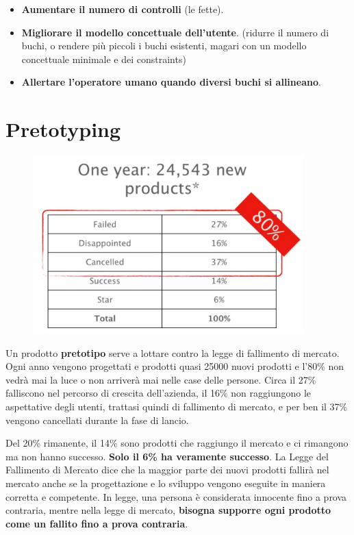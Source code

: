 \documentclass[a4paper,11pt,oneside]{book}
\begin{document}
\begin{itemize}
	\item \textbf{Aumentare il numero di controlli} (le fette).
	\item \textbf{Migliorare il modello concettuale dell'utente}. (ridurre il numero di buchi, o rendere più piccoli i buchi esistenti, magari con un modello concettuale minimale e dei constraints)
	\item \textbf{Allertare l'operatore umano quando diversi buchi si allineano}.
\end{itemize}

\pagebreak

\chapter{Pretotyping}
\begin{figure}[!h]
	\centering
	\includegraphics[scale=0.5]{immagini/Fall_mercato.png}
\end{figure}
Un prodotto \textbf{pretotipo} serve a lottare contro la legge di fallimento di mercato. Ogni anno vengono progettati e prodotti quasi 25000 nuovi prodotti e l'80\% non vedrà mai la luce o non arriverà mai nelle case delle persone. Circa il 27\%
falliscono nel percorso di crescita dell'azienda, il 16\% non raggiungono le aspettative degli utenti, trattasi quindi di fallimento di mercato, e per ben il 37\% vengono cancellati durante la fase di lancio.

Del 20\% rimanente, il 14\% sono prodotti che raggiungo il mercato e ci rimangono ma
non hanno successo. \textbf{Solo il 6\% ha veramente successo}. La
Legge del Fallimento di Mercato dice che la maggior parte dei nuovi prodotti fallirà nel mercato anche se la progettazione e lo sviluppo vengono eseguite in maniera corretta e competente.
In legge, una persona è considerata innocente fino a prova contraria, mentre nella legge di mercato, \textbf{bisogna supporre ogni prodotto come un fallito fino a prova contraria}.
\end{document}
